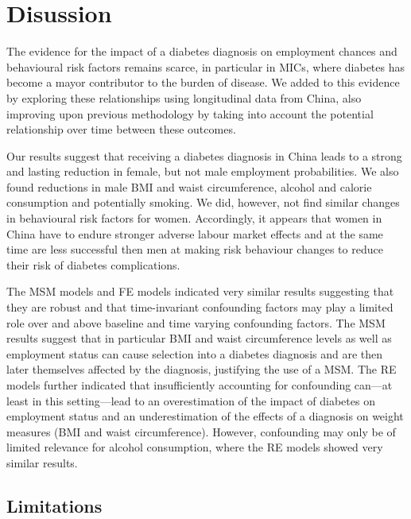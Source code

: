 \begin{landscape}
\begin{figure}
\begin{center}
\end{center}
\end{figure}
\end{landscape}



\section{\label{sec:Discussion5}Disussion}

The evidence for the impact of a diabetes diagnosis on employment chances and behavioural risk factors remains scarce, in particular in \acp{MIC}, where diabetes has become a mayor contributor to the burden of disease. We added to this evidence by exploring these relationships using longitudinal data from China, also improving upon previous methodology by taking into account the potential relationship over time between these outcomes.

Our results suggest that receiving a diabetes diagnosis in China leads to a strong and lasting reduction in female, but not male employment probabilities. We also found reductions in male \ac{BMI} and waist circumference, alcohol and calorie consumption and potentially smoking. We did, however, not find similar changes in behavioural risk factors for women. Accordingly, it appears that women in China have to endure stronger adverse labour market effects and at the same time are less successful then men at making risk behaviour changes to reduce their risk of diabetes complications.

The \ac{MSM} models and \ac{FE} models indicated very similar results suggesting that they are robust and that time-invariant confounding factors may play a limited role over and above baseline and time varying confounding factors. The \ac{MSM} results suggest that in particular \ac{BMI} and waist circumference levels as well as employment status can cause selection into a diabetes diagnosis and are then later themselves affected by the diagnosis, justifying the use of a \ac{MSM}. The \ac{RE} models further indicated that insufficiently accounting for confounding can---at least in this setting---lead to an overestimation of the impact of diabetes on employment status and an underestimation of the effects of a diagnosis on weight measures (\ac{BMI} and waist circumference). However, confounding may only be of limited relevance for  alcohol consumption, where the \ac{RE} models showed very similar results.

\subsection{Limitations}

